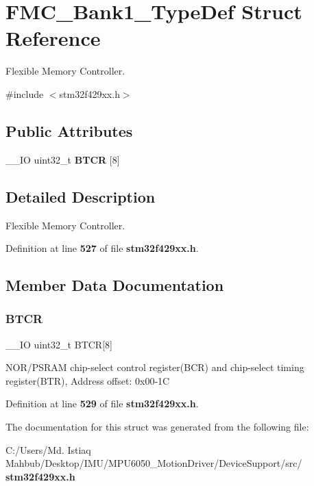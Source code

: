 \section{F\+M\+C\+\_\+\+Bank1\+\_\+\+Type\+Def Struct Reference}
\label{structFMC__Bank1__TypeDef}


Flexible Memory Controller.  




{\ttfamily \#include $<$stm32f429xx.\+h$>$}

\subsection*{Public Attributes}
\begin{DoxyCompactItemize}
\item 
\+\_\+\+\_\+\+IO uint32\+\_\+t \textbf{ B\+T\+CR} [8]
\end{DoxyCompactItemize}


\subsection{Detailed Description}
Flexible Memory Controller. 

Definition at line \textbf{ 527} of file \textbf{ stm32f429xx.\+h}.



\subsection{Member Data Documentation}
\mbox{\label{structFMC__Bank1__TypeDef_a80a6708b507f6eecbc10424fdb088b79}} 
\subsubsection{B\+T\+CR}
{\footnotesize\ttfamily \+\_\+\+\_\+\+IO uint32\+\_\+t B\+T\+CR[8]}

N\+O\+R/\+P\+S\+R\+AM chip-\/select control register(\+B\+C\+R) and chip-\/select timing register(\+B\+T\+R), Address offset\+: 0x00-\/1C 

Definition at line \textbf{ 529} of file \textbf{ stm32f429xx.\+h}.



The documentation for this struct was generated from the following file\+:\begin{DoxyCompactItemize}
\item 
C\+:/\+Users/\+Md. Istiaq Mahbub/\+Desktop/\+I\+M\+U/\+M\+P\+U6050\+\_\+\+Motion\+Driver/\+Device\+Support/src/\textbf{ stm32f429xx.\+h}\end{DoxyCompactItemize}
